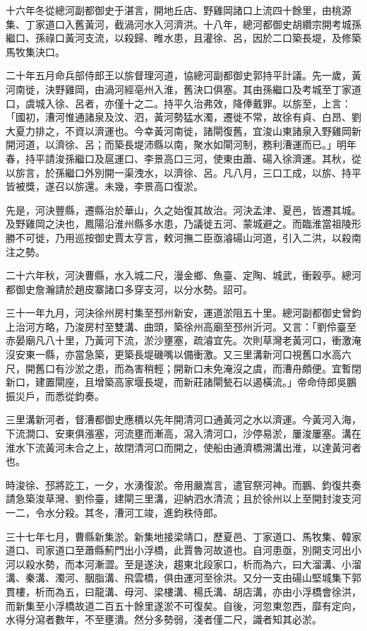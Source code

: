十六年冬從總河副都御史于湛言，開地丘店、野雞岡諸口上流四十餘里，由桃源集、丁家道口入舊黃河，截渦河水入河濟洪。十八年，總河都御史胡纘宗開考城孫繼口、孫祿口黃河支流，以殺歸、睢水患，且灌徐、呂，因於二口築長堤，及修築馬牧集決口。

二十年五月命兵部侍郎王以旂督理河道，協總河副都御史郭持平計議。先一歲，黃河南徙，決野雞岡，由渦河經亳州入淮，舊決口俱塞。其由孫繼口及考城至丁家道口，虞城入徐、呂者，亦僅十之二。持平久治弗效，降俸戴罪。以旂至，上言：「國初，漕河惟通諸泉及汶、泗，黃河勢猛水濁，遷徙不常，故徐有貞、白昂、劉大夏力排之，不資以濟運也。今幸黃河南徙，諸閘復舊，宜浚山東諸泉入野雞岡新開河道，以濟徐、呂；而築長堤沛縣以南，聚水如閘河制，務利漕運而已。」明年春，持平請浚孫繼口及扈運口、李景高口三河，使東由蕭、碭入徐濟運。其秋，從以旂言，於孫繼口外別開一渠洩水，以濟徐、呂。凡八月，三口工成，以旂、持平皆被獎，遂召以旂還。未幾，李景高口復淤。

先是，河決豐縣，遷縣治於華山，久之始復其故治。河決孟津、夏邑，皆遷其城。及野雞岡之決也，鳳陽沿淮州縣多水患，乃議徙五河、蒙城避之。而臨淮當祖陵形勝不可徙，乃用巡按御史賈太亨言，敕河撫二臣亟濬碭山河道，引入二洪，以殺南注之勢。

二十六年秋，河決曹縣，水入城二尺，漫金鄉、魚臺、定陶、城武，衝穀亭。總河都御史詹瀚請於趙皮寨諸口多穿支河，以分水勢。詔可。

三十一年九月，河決徐州房村集至邳州新安，運道淤阻五十里。總河副都御史曾鈞上治河方略，乃浚房村至雙溝、曲頭，築徐州高廟至邳州沂河。又言：「劉伶臺至赤晏廟凡八十里，乃黃河下流，淤沙壅塞，疏濬宜先。次則草灣老黃河口，衝激淹沒安東一縣，亦當急築，更築長堤磯嘴以備衝激。又三里溝新河口視舊口水高六尺，開舊口有沙淤之患，而為害稍輕；開新口未免淹沒之虞，而漕舟頗便。宜暫閉新口，建置閘座，且增築高家堰長堤，而新莊諸閘甃石以遏橫流。」帝命侍郎吳鵬振災戶，而悉從鈞奏。

三里溝新河者，督漕都御史應檟以先年開清河口通黃河之水以濟運。今黃河入海，下流澗口、安東俱漲塞，河流壅而漸高，瀉入清河口，沙停易淤，屢浚屢塞。溝在淮水下流黃河未合之上，故閉清河口而開之，使船由通濟橋溯溝出淮，以達黃河者也。

時浚徐、邳將訖工，一夕，水湧復淤。帝用嚴嵩言，遣官祭河神。而鵬、鈞復共奏請急築浚草灣、劉伶臺，建閘三里溝，迎納泗水清流；且於徐州以上至開封浚支河一二，令水分殺。其冬，漕河工竣，進鈞秩侍郎。

三十七年七月，曹縣新集淤。新集地接梁靖口，歷夏邑、丁家道口、馬牧集、韓家道口、司家道口至蕭縣薊門出小浮橋，此賈魯河故道也。自河患亟，別開支河出小河以殺水勢，而本河漸澀。至是遂決，趨東北段家口，析而為六，曰大溜溝、小溜溝、秦溝、濁河、胭脂溝、飛雲橋，俱由運河至徐洪。又分一支由碭山堅城集下郭貫樓，析而為五，曰龍溝、母河、梁樓溝、楊氏溝、胡店溝，亦由小浮橋會徐洪，而新集至小浮橋故道二百五十餘里遂淤不可復矣。自後，河忽東忽西，靡有定向，水得分瀉者數年，不至壅潰。然分多勢弱，淺者僅二尺，識者知其必淤。

